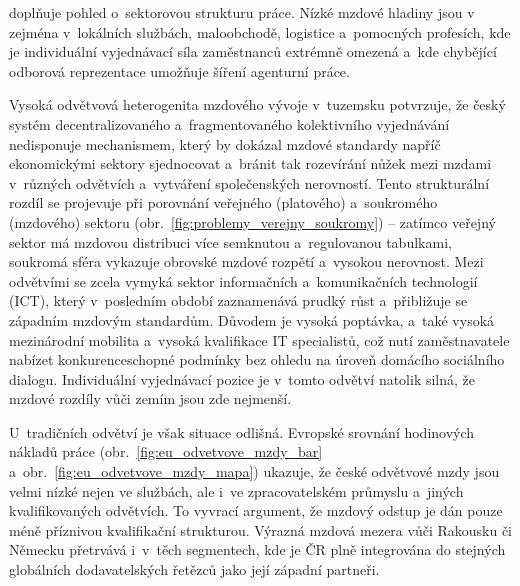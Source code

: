 doplňuje pohled o~sektorovou strukturu práce. Nízké mzdové hladiny jsou v~ zejména v~lokálních službách, maloobchodě, logistice a~pomocných profesích, kde je individuální vyjednávací síla zaměstnanců extrémně omezená a~kde chybějící odborová reprezentace umožňuje šíření agenturní práce.\par



 Vysoká odvětvová heterogenita mzdového vývoje v~tuzemsku potvrzuje, že český systém decentralizovaného a~fragmentovaného kolektivního vyjednávání nedisponuje mechanismem, který by dokázal mzdové standardy napříč ekonomickými sektory sjednocovat a~bránit tak rozevírání nůžek mezi mzdami v~různých odvětvích a~vytváření společenských nerovností. Tento strukturální rozdíl se projevuje při porovnání veřejného (platového) a~soukromého (mzdového) sektoru (obr.~\ref{fig:problemy_verejny_soukromy}) -- zatímco veřejný sektor má mzdovou distribuci více semknutou a~regulovanou tabulkami, soukromá sféra vykazuje obrovské mzdové rozpětí a~vysokou nerovnost. Mezi odvětvími se zcela vymyká sektor informačních a~komunikačních technologií (\acs{ICT}), který v~posledním období zaznamenává prudký růst a~přibližuje se západním mzdovým standardům. Důvodem je vysoká poptávka, a~také vysoká mezinárodní mobilita a~vysoká kvalifikace IT specialistů, což nutí zaměstnavatele nabízet konkurenceschopné podmínky bez ohledu na úroveň domácího sociálního dialogu. Individuální vyjednávací pozice je v~tomto odvětví natolik silná, že mzdové rozdíly vůči zemím  jsou zde nejmenší.\par

U~tradičních odvětví je však situace odlišná. Evropské srovnání hodinových nákladů práce (obr.~\ref{fig:eu_odvetvove_mzdy_bar} a~obr.~\ref{fig:eu_odvetvove_mzdy_mapa}) ukazuje, že české odvětvové mzdy jsou velmi nízké nejen ve službách, ale i~ve zpracovatelském průmyslu a~jiných kvalifikovaných odvětvích. To vyvrací argument, že mzdový odstup  je dán pouze méně příznivou kvalifikační strukturou. Výrazná mzdová mezera vůči Rakousku či Německu přetrvává i~v~těch segmentech, kde je \ac{ČR} plně integrována do stejných globálních dodavatelských řetězců jako její západní partneři.\par



